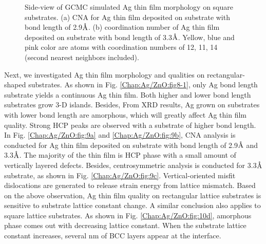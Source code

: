 \begingroup
\begin{figure}[!ht]
  \centering
  \label{Chap:Ag/ZnO:fig:10g}
  \label{Chap:Ag/ZnO:fig:10h}
\caption[Side-view of \ac{GCMC} simulated Ag thin film morphology on square substrates.]{Side-view of \ac{GCMC} simulated Ag thin film morphology on square substrates. (a) \ac{CNA} for Ag thin film deposited on substrate with bond length of 2.9$\mbox{\normalfont\AA}$. (b) coordination number of Ag thin film deposited on substrate with bond length of 3.3$\mbox{\normalfont\AA}$. Yellow, blue and pink color are atoms with coordination numbers of 12, 11, 14 (second nearest neighbors included).}
  \label{Chap:Ag/ZnO:fig10-3}
\end{figure}
\endgroup

Next, we investigated Ag thin film morphology and qualities on rectangular-shaped substrates. As shown in Fig. \ref{Chap:Ag/ZnO:fig8-1}, only Ag bond length substrate yields a continuous Ag thin film. Both higher and lower bond length substrates grow 3-D islands. Besides, From \ac{XRD} results, Ag grown on substrates with lower bond length are amorphous, which will greatly affect Ag thin film quality. Strong \ac{HCP} peaks are observed with a substrate of higher bond length. In Fig. \ref{Chap:Ag/ZnO:fig:9a} and \ref{Chap:Ag/ZnO:fig:9b}, \ac{CNA} analysis is conducted for Ag thin film deposited on substrate with bond length of 2.9$\mbox{\normalfont\AA}$ and 3.3$\mbox{\normalfont\AA}$. The majority of the thin film is \ac{HCP} phase with a small amount of vertically layered defects. Besides, centrosymmetric analysis is conducted for 3.3$\mbox{\normalfont\AA}$ substrate, as shown in Fig. \ref{Chap:Ag/ZnO:fig:9c}. Vertical-oriented misfit dislocations are generated to release strain energy from lattice mismatch. Based on the above observation, Ag thin film quality on rectangular lattice substrates is sensitive to substrate lattice constant change. A similar conclusion also applies to square lattice substrates. As shown in Fig. \ref{Chap:Ag/ZnO:fig:10d}, amorphous phase comes out with decreasing lattice constant. When the substrate lattice constant increases, several nm of \ac{BCC} layers appear at the interface. 

